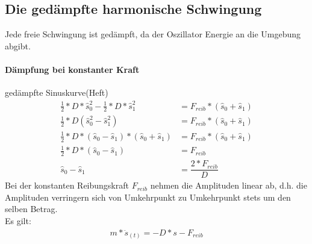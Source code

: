\documentclass[12 pt]{article}
\numberwithin{equation}{section}
\begin{document}
	\subsection{Die gedämpfte harmonische Schwingung}
	Jede freie Schwingung ist gedämpft, da der Oszillator Energie an die Umgebung abgibt.
	\paragraph{Dämpfung bei konstanter Kraft}
	gedämpfte Sinuskurve(Heft)
	\begin{align}
	\frac{1}{2}*D*\hat{s}_{0}^2-\frac{1}{2}*D*\hat{s}_{1}^2&=F_{reib}*(\hat{s}_0+\hat{s}_1)\nonumber\\
	\frac{1}{2}*D(\hat{s}_0^2-\hat{s}_1^2)&=F_{reib}*(\hat{s}_0+\hat{s}_1)\nonumber\\
	\frac{1}{2}*D*(\hat{s}_0-\hat{s}_1)*(\hat{s}_0+\hat{s}_1)&=F_{reib}*(\hat{s}_0+\hat{s}_1)\nonumber\\
	\frac{1}{2}*D*(\hat{s}_0-\hat{s}_1)&=F_{reib}\nonumber\\
	\hat{s}_0-\hat{s}_1&=\dfrac{2*F_{reib}}{D}
	\end{align}
	Bei der konstanten Reibungskraft $F_{reib}$ nehmen die Amplituden linear ab, d.h. die Amplituden verringern sich von Umkehrpunkt zu Umkehrpunkt stets um den selben Betrag.\\
	Es gilt:
	\begin{align}
		m*\ddot{s}_{(t)}=-D*s-F_{reib}
	\end{align}
\end{document}

